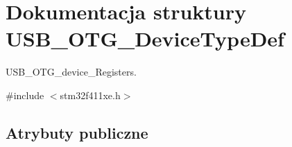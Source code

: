 \hypertarget{struct_u_s_b___o_t_g___device_type_def}{}\section{Dokumentacja struktury U\+S\+B\+\_\+\+O\+T\+G\+\_\+\+Device\+Type\+Def}
\label{struct_u_s_b___o_t_g___device_type_def}


U\+S\+B\+\_\+\+O\+T\+G\+\_\+device\+\_\+\+Registers.  




{\ttfamily \#include $<$stm32f411xe.\+h$>$}

\subsection*{Atrybuty publiczne}
